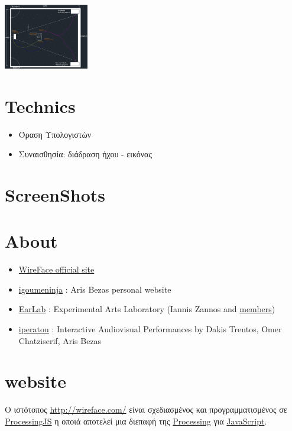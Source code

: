 \documentclass[08pt, a4paper]{scrartcl}
\begin{document}
\includegraphics[width=10em]{./../installation/wireface_setup.png}
 
\section{Technics}
\label{sec-4}


\begin{itemize}
\item Όραση Υπολογιστών
\item Συναισθησία: διάδραση ήχου - εικόνας
\end{itemize}
\section{ScreenShots}
\label{sec-5}

\begin{center}

\end{center}
\section{About}
\label{sec-6}

\begin{itemize}
\item \href{http://wireface.com/}{WireFace official site}
\item \href{http://igoumeninja.org/}{igoumeninja} : Aris Bezas personal website
\item \href{http://earlab.org/}{EarLab} : Experimental Arts Laboratory (Iannis Zannos and \href{http://earlab.org/pmwiki.php?n=Members/HomePage}{members})
\item \href{http://iperatou.com/}{iperatou} : Interactive Audiovisual Performances by Dakis Trentos, Omer Chatziserif, Aris Bezas
\end{itemize}
\section{website}
\label{sec-7}

Ο ιστότοπος \href{http://wireface.com/}{http://wireface.com/} είναι σχεδιασμένος και προγραμματισμένος σε
\href{http://processingjs.org/}{ProcessingJS} η οποιά αποτελεί μια διεπαφή της \href{http://processing.org/}{Processing} για \href{http://en.wikipedia.org/wiki/JavaScript}{JavaScript}. 
\end{document}
